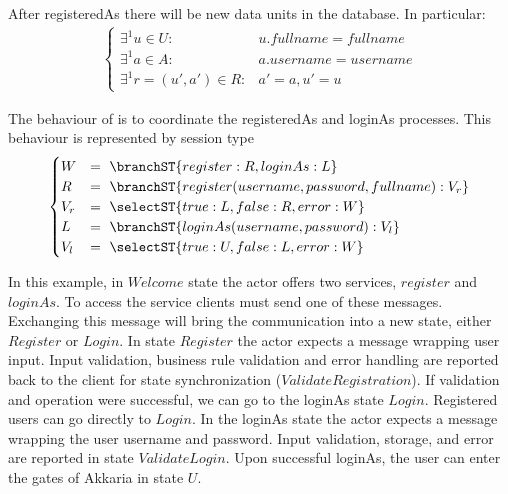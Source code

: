 %
After registeredAs there will be new data units in the database. In
particular:
\begin{align}
  \begin{cases}
    \exists^1 u \in U:& u.fullname = fullname\\
    \exists^1 a \in A:& a.username = username\\
    \exists^1 r=(u',a') \in R:& a' = a, u' = u
  \end{cases}
\end{align}
%
\par
%
The behaviour of  is to coordinate the registeredAs
and loginAs processes. This behaviour is represented by session type
\begin{align}
  \begin{cases}
    W &=\ \branchST{register: R, loginAs: L}\\
    R &=\ \branchST{register(username,password,fullname): V_r}\\
    V_r &=\ \selectST{true: L, false: R, error: W}\\
    L &=\ \branchST{loginAs(username, password): V_l}\\
    V_l &=\ \selectST{true: U, false: L, error: W}
  \end{cases}
          \label{eq:session-type-wa}
\end{align}
%

%
In this example, in $Welcome$ state the actor offers two services,
$register$ and $loginAs$. To access the service clients must send one of
these messages. Exchanging this message will bring the communication
into a new state, either $Register$ or $Login$.
%
In state $Register$ the actor expects a message wrapping user
input. Input validation, business rule validation and error handling
are reported back to the client for state synchronization
($Validate Registration$).
%
If validation and operation were successful, we can go to the loginAs
state $Login$. Registered users can go directly to $Login$.
%
In the loginAs state the actor expects a message wrapping the user
username and password. Input validation, storage, and error are
reported in state $Validate Login$. Upon successful loginAs, the user
can enter the gates of Akkaria in state $U$.
%

%

%

%

%
% 



